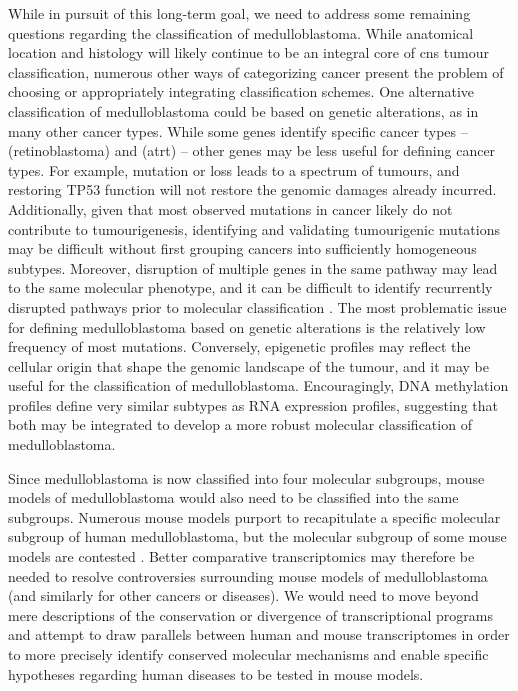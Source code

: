 While in pursuit of this long-term goal, we need to address some remaining questions regarding the classification of medulloblastoma. While anatomical location and histology will likely continue to be an integral core of \gls{cns} tumour classification, numerous other ways of categorizing cancer present the problem of choosing or appropriately integrating classification schemes. One alternative classification of medulloblastoma could be based on genetic alterations, as in many other cancer types. While some genes identify specific cancer types --  (retinoblastoma) and  (\gls{atrt}) -- other genes may be less useful for defining cancer types. For example,  mutation or loss leads to a spectrum of tumours, and restoring TP53 function will not restore the genomic damages already incurred. Additionally, given that most observed mutations in cancer likely do not contribute to tumourigenesis, identifying and validating tumourigenic mutations may be difficult without first grouping cancers into sufficiently homogeneous subtypes. Moreover, disruption of multiple genes in the same pathway may lead to the same molecular phenotype, and it can be difficult to identify recurrently disrupted pathways prior to molecular classification . The most problematic issue for defining medulloblastoma based on genetic alterations is the relatively low frequency of most mutations. Conversely, epigenetic profiles may reflect the cellular origin that shape the genomic landscape of the tumour, and it may be useful for the classification of medulloblastoma. Encouragingly, DNA methylation profiles define very similar subtypes as RNA expression profiles, suggesting that both may be integrated to develop a more robust molecular classification of medulloblastoma.

Since medulloblastoma is now classified into four molecular subgroups, mouse models of medulloblastoma would also need to be classified into the same subgroups. Numerous mouse models purport to recapitulate a specific molecular subgroup of human medulloblastoma,  but the molecular subgroup of some mouse models are contested . Better comparative transcriptomics may therefore be needed to resolve controversies surrounding mouse models of medulloblastoma (and similarly for other cancers or diseases). We would need to move beyond mere descriptions of the conservation or divergence of transcriptional programs and attempt to draw parallels between human and mouse transcriptomes in order to more precisely identify conserved molecular mechanisms and enable specific hypotheses regarding human diseases to be tested in mouse models.

